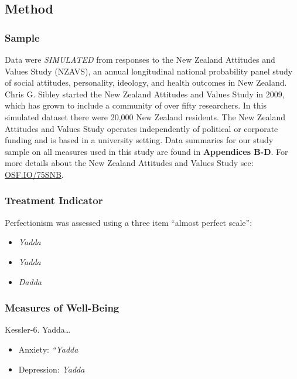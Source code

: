 \documentclass[
  single column]{article}
\providecommand{\tightlist}{%
  \setlength{\itemsep}{0pt}\setlength{\parskip}{0pt}}\usepackage{longtable,booktabs,array}
\begin{document}
\subsection{Method}\label{method}

\subsubsection{Sample}\label{sample}

Data were \emph{SIMULATED} from responses to the New Zealand Attitudes
and Values Study (NZAVS), an annual longitudinal national probability
panel study of social attitudes, personality, ideology, and health
outcomes in New Zealand. Chris G. Sibley started the New Zealand
Attitudes and Values Study in 2009, which has grown to include a
community of over fifty researchers. In this simulated dataset there
were 20,000 New Zealand residents. The New Zealand Attitudes and Values
Study operates independently of political or corporate funding and is
based in a university setting. Data summaries for our study sample on
all measures used in this study are found in \textbf{Appendices B-D}.
For more details about the New Zealand Attitudes and Values Study see:
\href{https://doi.org/10.17605/OSF.IO/75SNB}{OSF.IO/75SNB}.

\subsubsection{Treatment Indicator}\label{treatment-indicator}

Perfectionism was assessed using a three item ``almost perfect scale'':

\begin{itemize}
\tightlist
\item
  \emph{Yadda}
\item
  \emph{Yadda}
\item
  \emph{Dadda}
\end{itemize}

\subsubsection{Measures of Well-Being}\label{measures-of-well-being}

Kessler-6. Yadda\ldots{}

\begin{itemize}
\item
  Anxiety: \emph{``Yadda}
\item
  Depression: \emph{Yadda}
\end{itemize}
\end{document}
